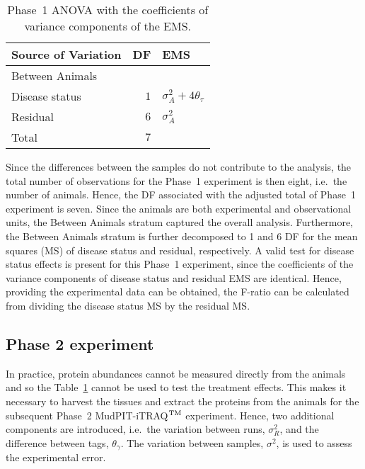 \documentclass[article]{jss}
\begin{document}
\begin{table}[ht]
\centering
\caption{Phase~1 ANOVA with the coefficients of variance components of the EMS.}
\begin{tabular}[t]{lrl}
\toprule
\multicolumn{1}{l}{\textbf{Source of Variation}} & \multicolumn{1}{l}{\textbf{DF}} & \multicolumn{1}{l}{\textbf{EMS}}\\
\midrule
Between Animals 		\\
\quad Disease status 	& $1$ 	& $\sigma_{A}^2 + 4\theta_{\tau}$\\
\quad Residual		& $6$ 	& $\sigma_{A}^2$\\\hline
Total 						& $7$    & \\
\bottomrule
\end{tabular}
\label{tab:Phase1ANOVA}
\end{table}

Since the differences between the samples do not contribute to the analysis, the total number of observations for the Phase~1 experiment is then eight, i.e.\ the number of animals. Hence, the DF associated with the adjusted total of Phase~1 experiment is seven. Since the animals are both experimental and observational units, the Between Animals stratum captured the overall analysis. Furthermore, the Between Animals stratum is further decomposed to 1 and 6 DF for the mean squares (MS) of disease status and residual, respectively. A valid test for disease status effects is present for this Phase~1 experiment, since the coefficients of the variance components of disease status and residual EMS are identical. Hence, providing the experimental data can be obtained, the F-ratio can be calculated from dividing the disease status MS by the residual MS. 

\subsection{Phase 2 experiment}
\label{subsec:Phase2Exp}
In practice, protein abundances cannot be measured directly from the animals and so the Table~\ref{tab:Phase1ANOVA} cannot be used to test the treatment effects. This makes it necessary to harvest the tissues and extract the proteins from the animals for the subsequent Phase~2 MudPIT-iTRAQ$^{\rm TM}$ experiment. Hence, two additional components are introduced, i.e.\ the variation between runs, $\sigma_{R}^2$, and the difference between tags, $\theta_{\gamma}$. The variation between samples, $\sigma^2$, is used to assess the experimental error. 
\end{document}
